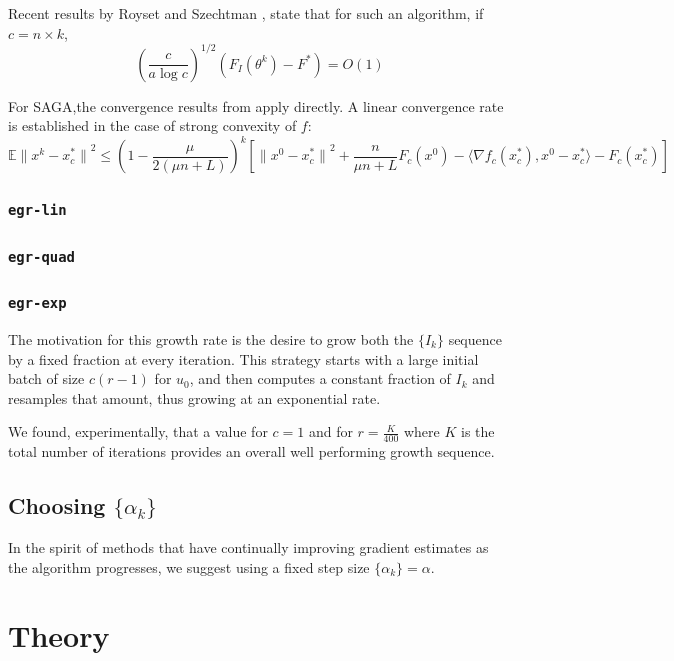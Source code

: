 \documentclass[11pt]{article}
\begin{document}
Recent results by Royset and Szechtman \cite{royset2013optimal}, state that for such an algorithm, if $c = n \times k$,
\[ \left( \frac{c}{a \log c}\right)^{1/2} (F_I(\theta^{k}) -F^*) = O(1) \]

For SAGA,the convergence results from \cite{NIPS2014_5258} apply directly. A linear convergence rate is established in the case of strong convexity of $f$: 
\begin{equation}
	\mathbb{E}{\| x^k - x^*_c\|}^2 \leq {\left( 1- \frac{\mu}{2 (\mu n +L)}\right)}^k \left[ {\| x^0 - x^*_c\|}^2 + \frac{n}{\mu n +L} F_c(x^0) - \langle  \nabla f_c(x^*_c), x^0 - x^*_c\rangle - F_c(x^*_c) \right] 
\end{equation}

\subsubsection{\texttt{egr-lin}}

\subsubsection{\texttt{egr-quad}}

\subsubsection{\texttt{egr-exp}}

The motivation for this growth rate is the desire to grow both the $\{I_k\}$ sequence by a fixed fraction at every iteration. This strategy starts with a large initial batch of size $c(r-1)$ for $u_0$, and then computes a constant fraction of $I_k$ and resamples that amount, thus growing at an exponential rate. 

We found, experimentally, that a value for $c=1$ and for $r = \frac{K}{400}$ where $K$ is the total number of iterations provides an overall well performing growth sequence. 

\subsection{Choosing $\{\alpha_k\}$}

In the spirit of methods that have continually improving gradient estimates as the algorithm progresses, we suggest using a fixed step size $\{\alpha_k\} = \alpha$. 

\section{Theory}
\end{document}
